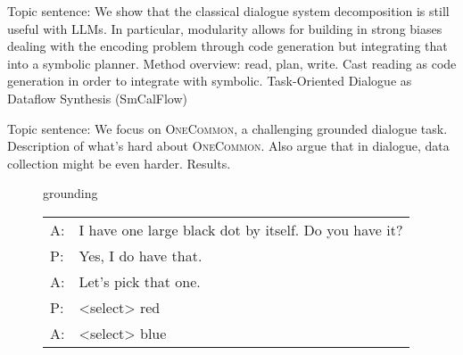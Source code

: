 \documentclass[11pt]{article}
\begin{document}
Topic sentence: We show that the classical dialogue system decomposition
is still useful with LLMs.
In particular, modularity allows for building in strong biases
dealing with the encoding problem through code generation
but integrating that into a symbolic planner.
Method overview: read, plan, write.
Cast reading as code generation in order to integrate with symbolic.
Task-Oriented Dialogue as Dataflow Synthesis (SmCalFlow)

Topic sentence: We focus on \textsc{OneCommon}, a challenging grounded dialogue task.
Description of what's hard about \textsc{OneCommon}.
Also argue that in dialogue, data collection might be even harder.
Results.

\begin{figure}[t]
\setlength{\abovecaptionskip}{0pt}
grounding

\centering

\scalebox{1.1}{
\begin{tikzpicture}


\filldraw[gray!160] (-.2,.6) circle (.45em); %
\filldraw[gray!40] (-.7,-.3) circle (.4em); %
\filldraw[gray!40] (.4,.1) circle (.3em); %
\filldraw[gray!100] (.8,-.1) circle (.3em); %

\filldraw[gray!140] (-1.3,-1.2) circle (.3em); %
\filldraw[gray!100] (-1.6,-1.8) circle (.3em); %
\filldraw[gray!110] (-.2,-1.1) circle (.4em); %

\filldraw[gray!100] (-1,1.5) circle (.3em); %
\filldraw[gray!100] (-.5,1.6) circle (.38em); %
\filldraw[gray!160] (.8,1.8) circle (.45em); %

\draw[blue,thick] (-.2,.6) circle (.7em);
\draw[red,thick] (.8,1.8) circle (.7em);

\draw[blue,thick] (-.3,-.7) circle (5em);
\draw[red,thick] (.2,1) circle (5em);
\end{tikzpicture}
}

\vspace{1em}

\small
\begin{tabular}[b]{@{}l@{}l@{}}
\toprule
{\color{blue} A}:\;&I have one large black dot by itself. Do you have it? \\
{\color{red} P}:\;&Yes, I do have that. \\
{\color{blue} A}:\;&Let's pick that one. \\
{\color{red} P}:\;&<select> {\color{red} red} \\
{\color{blue} A}:\;&<select> {\color{blue} blue}\\
\bottomrule
\end{tabular}


\end{figure}
\end{document}
